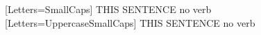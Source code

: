   [Letters=SmallCaps]
   THIS SENTENCE no verb                \\
  [Letters=UppercaseSmallCaps]
   THIS SENTENCE no verb
